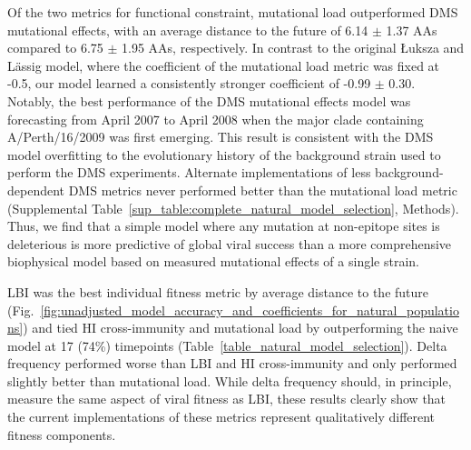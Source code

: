 Of the two metrics for functional constraint, mutational load outperformed DMS mutational effects, with an average distance to the future of 6.14 $\pm$ 1.37 AAs compared to 6.75 $\pm$ 1.95 AAs, respectively.
In contrast to the original {\L}uksza and L\"assig \cite{Luksza:2014hj} model, where the coefficient of the mutational load metric was fixed at -0.5, our model learned a consistently stronger coefficient of -0.99 $\pm$ 0.30.
Notably, the best performance of the DMS mutational effects model was forecasting from April 2007 to April 2008 when the major clade containing A/Perth/16/2009 was first emerging.
This result is consistent with the DMS model overfitting to the evolutionary history of the background strain used to perform the DMS experiments.
Alternate implementations of less background-dependent DMS metrics never performed better than the mutational load metric (Supplemental Table~\ref{sup_table:complete_natural_model_selection}, Methods).
Thus, we find that a simple model where any mutation at non-epitope sites is deleterious is more predictive of global viral success than a more comprehensive biophysical model based on measured mutational effects of a single strain.

LBI was the best individual fitness metric by average distance to the future (Fig.~\ref{fig:unadjusted_model_accuracy_and_coefficients_for_natural_populations}) and tied HI cross-immunity and mutational load by outperforming the naive model at 17 (74\%) timepoints (Table~\ref{table_natural_model_selection}).
Delta frequency performed worse than LBI and HI cross-immunity and only performed slightly better than mutational load.
While delta frequency should, in principle, measure the same aspect of viral fitness as LBI, these results clearly show that the current implementations of these metrics represent qualitatively different fitness components.

